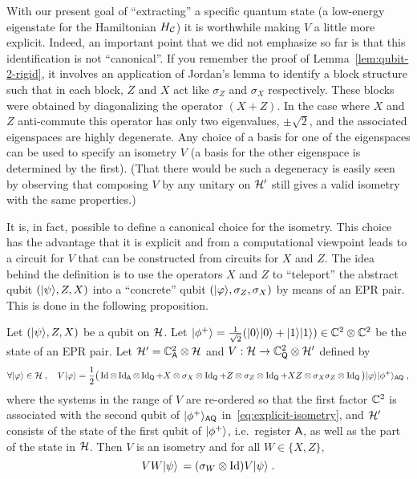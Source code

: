 With our present goal of ``extracting'' a specific quantum state (a low-energy eigenstate for the Hamiltonian $H_{\mathcal{C}}$) it is worthwhile making $V$ a little more explicit. Indeed, an important point that we did not emphasize so far is that this identification is not ``canonical''. If you remember the proof of Lemma~\ref{lem:qubit-2-rigid}, it involves an application of Jordan's lemma to identify a block structure such that in each block, $Z$ and $X$ act like $\sigma_Z$ and $\sigma_X$ respectively. These blocks were obtained by diagonalizing the operator $(X+Z)$. In the case where $X$ and $Z$ anti-commute this operator has only two eigenvalues, $\pm\sqrt{2}$, and the associated eigenspaces are highly degenerate. Any choice of a basis for one of the eigenspaces can be used to specify an isometry $V$ (a basis for the other eigenspace is determined by the first). (That there would be such a degeneracy is easily seen by observing that composing $V$ by any unitary on $\mathcal{H}'$ still gives a valid isometry with the same properties.)

It is, in fact, possible to define a canonical choice for the isometry. This choice has the advantage that it is explicit and from a computational viewpoint leads to a circuit for $V$ that can be constructed from circuits for $X$ and $Z$. The idea behind the definition is to use the operators $X$ and $Z$ to ``teleport'' the abstract qubit $(|\psi\rangle,Z,X)$ into a ``concrete'' qubit $(|\varphi\rangle,\sigma_Z,\sigma_X)$ by means of an EPR pair. This is done in the following proposition. 

\begin{proposition}\label{prop:explicit-iso}
Let $(|\psi\rangle,Z,X)$ be a qubit on $\mathcal{H}$. Let $|\phi^+\rangle = \frac{1}{\sqrt{2}} (|0\rangle|0\rangle + |1\rangle|1\rangle)\in \mathbb{C}^2 \otimes \mathbb{C}^2$ be the state of an EPR pair. Let $\mathcal{H}'= \mathbb{C}^2_{\textsf{A}} \otimes \mathcal{H}$ and $V: \mathcal{H} \to \mathbb{C}^2_{\textsf{Q}} \otimes \mathcal{H}'$ defined by
\begin{equation}\label{eq:explicit-isometry}
 \forall |\varphi\rangle \in \mathcal{H}\;,\quad V|\varphi\rangle = \frac{1}{2}\big(\mathop{\rm Id}\nolimits \otimes \mathop{\rm Id}\nolimits_{\textsf{A}}\otimes \mathop{\rm Id}\nolimits_{\textsf{Q}} + X \otimes \sigma_X \otimes \mathop{\rm Id}\nolimits_{\textsf{Q}} + Z \otimes \sigma_Z \otimes \mathop{\rm Id}\nolimits_{\textsf{Q}} + XZ \otimes \sigma_X\sigma_Z \otimes \mathop{\rm Id}\nolimits_{\textsf{Q}}\big) |\varphi\rangle |\phi^+\rangle_{{\textsf{AQ}}}\;,
\end{equation}
where the systems in the range of $V$ are re-ordered so that the first factor $\mathbb{C}^2$ is associated with the second qubit of $|\phi^+\rangle_{{\textsf{AQ}}}$ in~\eqref{eq:explicit-isometry}, and $\mathcal{H}'$ consists of the state of the first qubit of $|\phi^+\rangle$, i.e.\ register ${\textsf{A}}$, as well as the part of the state in $\mathcal{H}$.  
Then $V$ is an isometry and for all $W\in\{X,Z\}$,
\begin{equation}\label{eq:explicit-isometry-2}
VW |\psi\rangle\, = (\sigma_W \otimes \mathop{\rm Id}\nolimits) V |\psi\rangle\;.
\end{equation}
\end{proposition}

